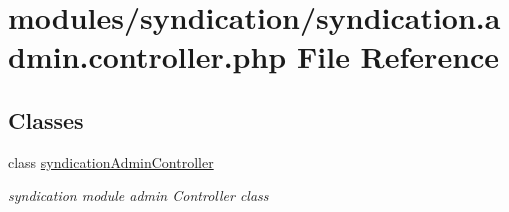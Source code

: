 \hypertarget{syndication_8admin_8controller_8php}{\section{modules/syndication/syndication.admin.\-controller.\-php File Reference}
\label{syndication_8admin_8controller_8php}
}
\subsection*{Classes}
\begin{DoxyCompactItemize}
\item 
class \hyperlink{classsyndicationAdminController}{syndication\-Admin\-Controller}
\begin{DoxyCompactList}\small\item\em syndication module admin Controller class \end{DoxyCompactList}\end{DoxyCompactItemize}
